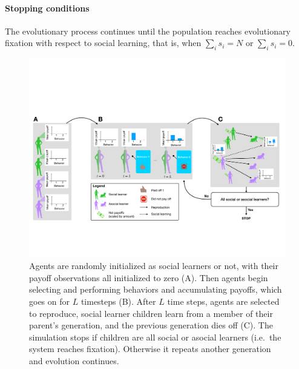 \documentclass[letterpaper,11.5pt]{scrartcl}
\newcommand{\cm}[1]{{\textcolor{mypurple} {({\tiny CM:} #1)}}}
\begin{document}
\paragraph{Stopping conditions} The evolutionary process continues until the
population reaches evolutionary fixation with respect to social learning, that is, when
$\sum_i s_i = N$ or $\sum_i s_i = 0$. 

\clearpage

\begin{figure}
  \caption{Agents are randomly initialized as social learners or not, with their
  payoff observations all initialized to zero (A). Then agents begin selecting
and performing behaviors and accumulating payoffs, which goes on for $L$
timesteps (B). After $L$ time steps, agents are selected to reproduce,
social learner children learn from a member of their parent's generation, and
the previous generation dies off (C). The simulation stops if children are all
social or asocial learners (i.e.\ the system reaches fixation).
Otherwise it repeats another generation and evolution continues.} 
  \label{fig:schematic}
  \centering
    \includegraphics[width=\textwidth]{Figures/IntraInterGenerationalDynamics.pdf}
\end{figure}
\end{document}
